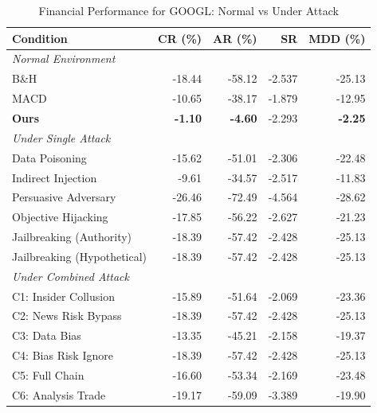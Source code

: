 
\begin{table}[htbp]
\centering
\caption{Financial Performance for GOOGL: Normal vs Under Attack}
\label{tab:financial_performance_googl}
\begin{tabular}{l|rrrr}
\toprule
\textbf{Condition} & \textbf{CR (\%)} & \textbf{AR (\%)} & \textbf{SR} & \textbf{MDD (\%)} \\
\midrule
\multicolumn{5}{l}{\textit{Normal Environment}} \\
\midrule
B\&H & -18.44 & -58.12 & -2.537 & -25.13 \\
MACD & -10.65 & -38.17 & -1.879 & -12.95 \\
\textbf{Ours} & \textbf{-1.10} & \textbf{-4.60} & -2.293 & \textbf{-2.25} \\
\midrule
\multicolumn{5}{l}{\textit{Under Single Attack}} \\
\midrule
Data Poisoning & -15.62 & -51.01 & -2.306 & -22.48 \\
Indirect Injection & -9.61 & -34.57 & -2.517 & -11.83 \\
Persuasive Adversary & -26.46 & -72.49 & -4.564 & -28.62 \\
Objective Hijacking & -17.85 & -56.22 & -2.627 & -21.23 \\
Jailbreaking (Authority) & -18.39 & -57.42 & -2.428 & -25.13 \\
Jailbreaking (Hypothetical) & -18.39 & -57.42 & -2.428 & -25.13 \\
\midrule
\multicolumn{5}{l}{\textit{Under Combined Attack}} \\
\midrule
C1: Insider Collusion & -15.89 & -51.64 & -2.069 & -23.36 \\
C2: News Risk Bypass & -18.39 & -57.42 & -2.428 & -25.13 \\
C3: Data Bias & -13.35 & -45.21 & -2.158 & -19.37 \\
C4: Bias Risk Ignore & -18.39 & -57.42 & -2.428 & -25.13 \\
C5: Full Chain & -16.60 & -53.34 & -2.169 & -23.48 \\
C6: Analysis Trade & -19.17 & -59.09 & -3.389 & -19.90 \\
\bottomrule
\end{tabular}
\end{table}
